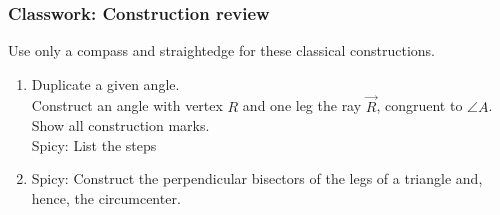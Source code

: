 \documentclass[12pt, oneside]{article}
\begin{document}
\subsubsection*{Classwork: Construction review}
Use only a compass and straightedge for these classical constructions.
  \begin{enumerate}

  \item Duplicate a given angle.\\[0.5cm]
  \hspace{1cm} Construct an angle with vertex $R$ and one leg the ray $\overrightarrow{R}$, congruent to $\angle A$. Show all construction marks.\\[0.5cm]
    Spicy: List the steps\\
    \vspace{1cm}
    \begin{center}
    \end{center}
\newpage

  \item Spicy: Construct the perpendicular bisectors of the legs of a triangle and, hence, the circumcenter.\\
    \vspace{3cm}
    \begin{center}
    \end{center}

\end{enumerate}
\end{document}
